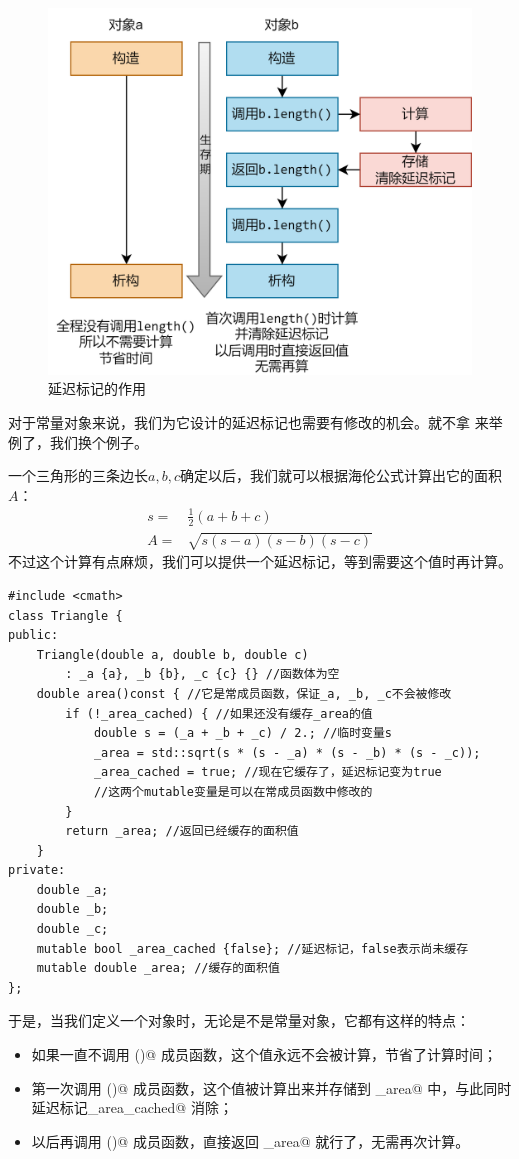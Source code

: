 \begin{figure}[htbp]
    \centering
    \includegraphics[width=.8\textwidth]{../images/generalized_parts/08_lazy_tag.drawio.png}
    \caption{延迟标记的作用}
\end{figure}
对于常量对象来说，我们为它设计的延迟标记也需要有修改的机会。就不拿 \lstinline@valarri@ 来举例了，我们换个例子。\par
一个三角形的三条边长$a, b, c$确定以后，我们就可以根据海伦公式计算出它的面积$A$：
\begin{align*}
s=&{}\frac12(a+b+c)\\
A=&{}\sqrt{s(s-a)(s-b)(s-c)}
\end{align*}
不过这个计算有点麻烦，我们可以提供一个延迟标记，等到需要这个值时再计算。
\begin{lstlisting}
#include <cmath>
class Triangle {
public:
    Triangle(double a, double b, double c)
        : _a {a}, _b {b}, _c {c} {} //函数体为空
    double area()const { //它是常成员函数，保证_a, _b, _c不会被修改
        if (!_area_cached) { //如果还没有缓存_area的值
            double s = (_a + _b + _c) / 2.; //临时变量s
            _area = std::sqrt(s * (s - _a) * (s - _b) * (s - _c));
            _area_cached = true; //现在它缓存了，延迟标记变为true
            //这两个mutable变量是可以在常成员函数中修改的
        }
        return _area; //返回已经缓存的面积值
    }
private:
    double _a;
    double _b;
    double _c;
    mutable bool _area_cached {false}; //延迟标记，false表示尚未缓存
    mutable double _area; //缓存的面积值
};
\end{lstlisting}\par
于是，当我们定义一个对象时，无论是不是常量对象，它都有这样的特点：
\begin{itemize}
    \item 如果一直不调用 \lstinline@area()@ 成员函数，这个值永远不会被计算，节省了计算时间；
    \item 第一次调用 \lstinline@area()@ 成员函数，这个值被计算出来并存储到 \lstinline@_area@ 中，与此同时延迟标记\linebreak\lstinline@_area_cached@ 消除；
    \item 以后再调用 \lstinline@area()@ 成员函数，直接返回 \lstinline@_area@ 就行了，无需再次计算。
\end{itemize}\par
